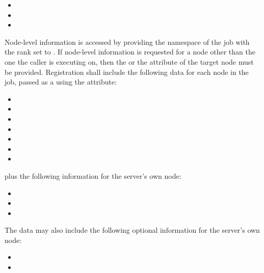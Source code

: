 \begin{itemize}
    \item {}
    \item {}
    \item {}
\end{itemize}


Node-level information is accessed by providing the namespace of the job with the rank set to . If node-level information is requested for a node other than the one the caller is executing on, then the  or the  attribute of the target node must be provided. Registration shall include the following data for each node in the job, passed as a  using the  attribute:

\begin{itemize}
    \item {}
    \item {}
    \item {}
    \item {}
    \item {}
    \item {}
    \item {}
\end{itemize}

plus the following information for the server's own node:

\begin{itemize}
    \item {}
    \item {}
    \item {}
\end{itemize}

The data may also include the following optional information for the server's own node:

\begin{itemize}
    \item {}
    \item {}
\end{itemize}


